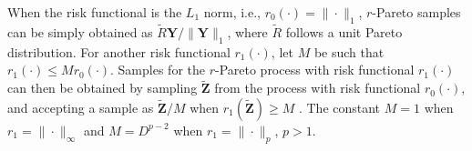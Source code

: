 \documentclass[12pt]{article}
\begin{document}
When the risk functional is the $L_1$ norm, i.e., $r_0(\cdot)=\|\cdot\|_1$, $r$-Pareto samples can be simply obtained as $\tilde R\bm Y/\|\bm Y\|_1$, where $\tilde R$ follows a unit Pareto distribution.  
For another risk functional $r_1(\cdot)$, let $M$ be such that
$r_1 (\cdot) \leq Mr_0 (\cdot)$.
%
Samples for the $r$-Pareto process with risk functional $r_1(\cdot)$ can then be obtained by 
sampling $\bm{\tilde Z}$
from the process with risk functional $r_0(\cdot)$, 
and accepting a sample 
as $\bm{\tilde Z}/M$ when $r_1(\bm {\tilde Z})\geq M$ \citep[Proposition 2]{Dombry.etal:2024}.
% 
The constant $M=1$ when $r_1 =\|\cdot\|_\infty $ and $M=D^{p-2}$ when $r_1 = \|\cdot\|_p$, $p>1$.
\end{document}
